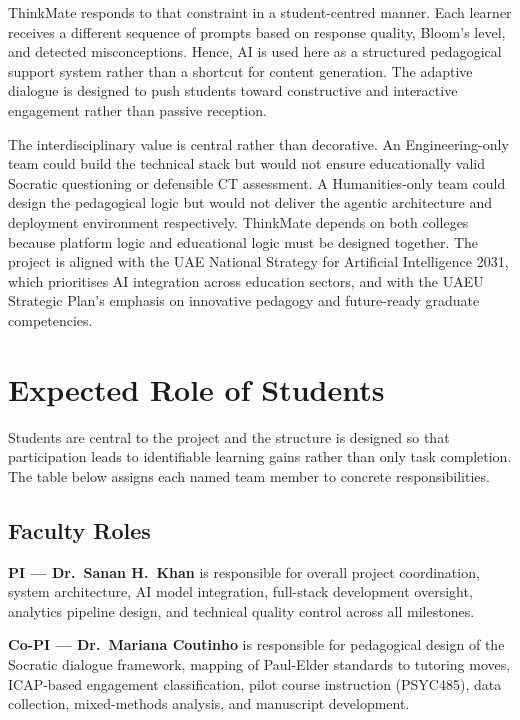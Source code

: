 \documentclass[11pt,a4paper]{article}
\begin{document}
ThinkMate responds to that constraint in a student-centred manner. Each learner receives a different sequence of prompts based on response quality, Bloom's level, and detected misconceptions. Hence, AI is used here as a structured pedagogical support system rather than a shortcut for content generation. The adaptive dialogue is designed to push students toward constructive and interactive engagement rather than passive reception.

The interdisciplinary value is central rather than decorative. An Engineering-only team could build the technical stack but would not ensure educationally valid Socratic questioning or defensible CT assessment. A Humanities-only team could design the pedagogical logic but would not deliver the agentic architecture and deployment environment respectively. ThinkMate depends on both colleges because platform logic and educational logic must be designed together. The project is aligned with the UAE National Strategy for Artificial Intelligence 2031, which prioritises AI integration across education sectors, and with the UAEU Strategic Plan's emphasis on innovative pedagogy and future-ready graduate competencies.

\section{Expected Role of Students}

Students are central to the project and the structure is designed so that participation leads to identifiable learning gains rather than only task completion. The table below assigns each named team member to concrete responsibilities.

\subsection*{Faculty Roles}

\textbf{PI --- Dr.\ Sanan H.\ Khan} is responsible for overall project coordination, system architecture, AI model integration, full-stack development oversight, analytics pipeline design, and technical quality control across all milestones.

\textbf{Co-PI --- Dr.\ Mariana Coutinho} is responsible for pedagogical design of the Socratic dialogue framework, mapping of Paul-Elder standards to tutoring moves, ICAP-based engagement classification, pilot course instruction (PSYC485), data collection, mixed-methods analysis, and manuscript development.
\end{document}
